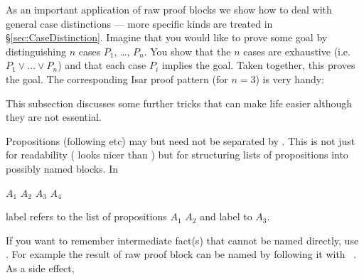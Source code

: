 \begin{isabellebody}
\begin{isamarkuptext}
As an important application of raw proof blocks we show how to deal
with general case distinctions --- more specific kinds are treated in
\S\ref{sec:CaseDistinction}. Imagine that you would like to prove some
goal by distinguishing $n$ cases $P_1$, \dots, $P_n$. You show that
the $n$ cases are exhaustive (i.e.\ $P_1 \lor \dots \lor P_n$) and
that each case $P_i$ implies the goal. Taken together, this proves the
goal. The corresponding Isar proof pattern (for $n = 3$) is very handy:%
\end{isamarkuptext}%
\isamarkuptrue%
%
\renewcommand{\isamarkupcmt}[1]{#1}
\isamarkupfalse%
\isamarkupfalse%
\isamarkupfalse%
\isamarkupfalse%
\isamarkupfalse%
\isamarkupfalse%
\isamarkupfalse%
\isamarkupfalse%
\isamarkupfalse%
\isamarkupfalse%
\isamarkupfalse%
\isamarkupfalse%
\isamarkupfalse%
\isamarkupfalse%
\isamarkupfalse%
\isamarkupfalse%
\isamarkupfalse%
\isamarkupfalse%
\isamarkupfalse%
\isamarkupfalse%
\isamarkupfalse%
\isamarkupfalse%
\isamarkupfalse%
\isamarkupfalse%
\isamarkupfalse%
\isamarkupfalse%
%
\renewcommand{\isamarkupcmt}[1]{{\isastylecmt--- #1}}
%
\isamarkuptrue%
%
\begin{isamarkuptext}%
This subsection discusses some further tricks that can make
life easier although they are not essential.%
\end{isamarkuptext}%
\isamarkuptrue%
%
\isamarkuptrue%
%
\begin{isamarkuptext}%
Propositions (following  etc) may but need not be
separated by . This is not just for readability
(    looks nicer than
  ) but for structuring lists of propositions
into possibly named blocks. In
\begin{center}
  $A_1$ $A_2$   $A_3$
 $A_4$
\end{center}
label  refers to the list of propositions $A_1$ $A_2$ and
label  to $A_3$.%
\end{isamarkuptext}%
\isamarkuptrue%
%
\isamarkuptrue%
%
\begin{isamarkuptext}%
If you want to remember intermediate fact(s) that cannot be
named directly, use . For example the result of raw
proof block can be named by following it with
~.  As a side effect,

\end{isamarkuptext}
\end{isabellebody}
